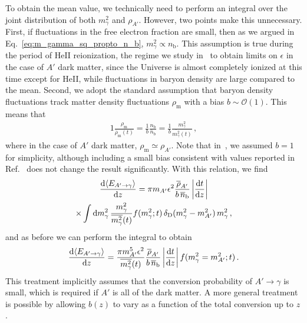 \documentclass[prd,aps,10pt,nofootinbib,twocolumn,superscriptaddress,preprintnumbers,balancelastpage,longbibliography]{revtex4-1}
\begin{document}
To obtain the mean value, we technically need to perform an integral over the joint distribution of both $m_\gamma^2$ and $\rho_{A'}$. However, two points make this unnecessary.
First, if fluctuations in the free electron fraction are small, then as we argued in Eq.~\eqref{eq:m_gamma_sq_propto_n_b}, $m_\gamma^2 \propto n_\text{b}$. 
This assumption is true during the period of HeII reionization, the regime we study in~ to obtain limits on $\epsilon$ in the case of $A'$ dark matter, since the Universe is almost completely ionized at this time except for HeII, while fluctuations in baryon density are large compared to the mean. 
Second, we adopt the standard assumption that baryon density fluctuations track matter density fluctuations $\rho_\text{m}$ with a bias $b \sim \mathcal{O}(1)$. 
This means that
%
\begin{alignat}{1}
    \frac{\rho_\text{m}}{\overline{\rho}_\text{m}(t)} = \frac{1}{b} \frac{n_\text{b}}{\overline{n}_\text{b}} = \frac{1}{b} \frac{m_\gamma^2}{\overline{m_\gamma^2}(t)} \,,
    \label{eq:rho_n_m_gamma_relation}
\end{alignat}
%
where in the case of $A'$ dark matter, $\rho_\text{m} \simeq \rho_{A'}$. Note that in~, we assumed $b = 1$ for simplicity, although including a small bias consistent with values reported in Ref.~\cite{Hurtado-Gil:2017dbm} does not change the result significantly. With this relation, we find
%
\begin{multline}
    \frac{\mathrm{d} \langle E_{A' \to \gamma} \rangle}{\mathrm{d} z} = \pi m_{A^\prime} \epsilon^2 \frac{\overline{\rho}_{A'}}{b\,\overline{n}_\text{b}} \left| \frac{\mathrm{d} t}{\mathrm{d} z} \right| \\
    \times \int \mathrm{d} m_\gamma^2 \, \frac{m_\gamma^2}{\overline{m_\gamma^2}(t)} f(m_\gamma^2;t) \, \delta_\text{D}(m_\gamma^2 - m_{A^\prime}^2)\, m_\gamma^2 \,,
    \label{eq:dE_dz_general}
\end{multline}
%
and as before we can perform the integral to obtain
%
\begin{alignat}{1}
    \frac{\mathrm{d} \langle E_{A' \to \gamma} \rangle}{\mathrm{d} z} = \frac{\pi m_{A^\prime}^5 \epsilon^2}{\overline{m_\gamma^2}(t)} \frac{\overline{\rho}_{A'}}{b\,\overline{n}_\text{b}} \left| \frac{\mathrm{d} t}{\mathrm{d} z} \right| f(m_\gamma^2 = m_{A^\prime}^2; t) \,.
\end{alignat}
%
This treatment implicitly assumes that the conversion probability of $A' \to \gamma$ is small, which is required if $A'$ is all of the dark matter. A more general treatment is possible by allowing $b(z)$ to vary as a function of the total conversion up to $z$. 
\end{document}
